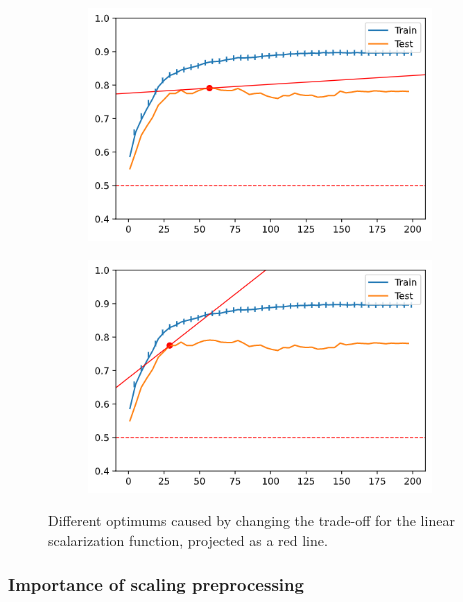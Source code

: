 \begin{figure}[H]
    \centering
    \begin{subfigure}[b]{0.4\linewidth}
        \includegraphics[width=\linewidth]{img/ch4/vanilla200-tradeoff.png}
    \end{subfigure}
    \begin{subfigure}[b]{0.4\linewidth}
        \includegraphics[width=\linewidth]{img/ch4/vanilla200-tradeoffB.png}
    \end{subfigure}
    \caption{Different optimums caused by changing the trade-off for the linear scalarization function, projected as a red line.}
    \label{fig:ch4.tradeoff}
\end{figure}

\subsubsection*{Importance of scaling preprocessing}

